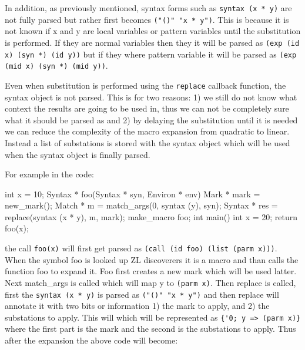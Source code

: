 \documentclass[12pt,english,letterpaper]{article}
\begin{document}
In addition, as previously mentioned, syntax forms such as
\verb/syntax (x * y)/ are not fully parsed but rather first becomes
\verb/("()" "x * y")/.  This is because it is not known if x and y are
local variables or pattern variables until the substitution is
performed.  If they are normal variables then they it will be parsed
as \verb/(exp (id x) (syn *) (id y))/ but if they where pattern
variable it will be parsed as \verb/(exp (mid x) (syn *) (mid y))/.

Even when substitution is performed using the \verb/replace/ callback
function, the syntax object is not parsed.  This is for two reasons: 1)
we still do not know what context the results are going to be used in,
thus we can not be completely sure what it should be
parsed as and 2) by delaying the substitution until it is needed we
can reduce the complexity of the macro expansion from quadratic to
linear.  Instead a list of substations is stored with the syntax
object which will be used when the syntax object is finally parsed.

For example in the code:

\begin{code}
int x = 10;
Syntax * foo(Syntax * syn, Environ * env) {
  Mark * mark = new_mark();
  Match * m = match_args(0, syntax (y), syn);
  Syntax * res = replace(syntax (x * y), m, mark);
}
make_macro foo;
int main() {
  int x = 20;
  return foo(x);
}
\end{code}

the call \verb/foo(x)/ will first get parsed as
\verb/(call (id foo) (list (parm x)))/.  When the symbol foo is looked
up ZL discoverers it is a macro and than calls the function foo to
expand it.  Foo first creates a new mark which will be used latter.
Next match\_args is called which will map y to \verb/(parm x)/.  Then
replace is called, first the \verb/syntax (x * y)/ is parsed as
\verb/("()" "x * y")/ and then replace will annotate it with two bits
or information 1) the mark to apply, and 2) the substations to apply.
This will which will be represented as \verb/{'0; y => (parm x)}/
where the first part is the mark and the second is the substations to
apply.  Thus after the expansion the above code will become:

\end{document}
